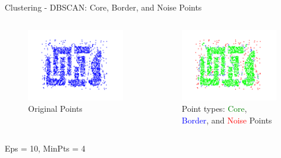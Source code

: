 \begin{frame}[allowframebreaks]{Clustering - DBSCAN: Core, Border, and Noise Points}
\begin{columns}
    \begin{column}{0.5\textwidth}
       \begin{figure}
            \centering
            \includegraphics[width=1.2\textwidth,keepaspectratio]{images/dul/dbscan/dbscan-original-pts-1.png}
            \caption{Original Points}
        \end{figure}
    \end{column}
    \begin{column}{0.5\textwidth}
        \begin{figure}
            \centering
            \includegraphics[width=1.2\textwidth,keepaspectratio]{images/dul/dbscan/dbscan-core-border-noise.png}
            \caption{Point types: \textcolor{green}{Core}, \textcolor{blue}{Border}, and \textcolor{red}{Noise} Points}
        \end{figure}
    \end{column}
\end{columns}

\begin{center}
Eps = 10, MinPts = 4
\end{center}

\end{frame}

